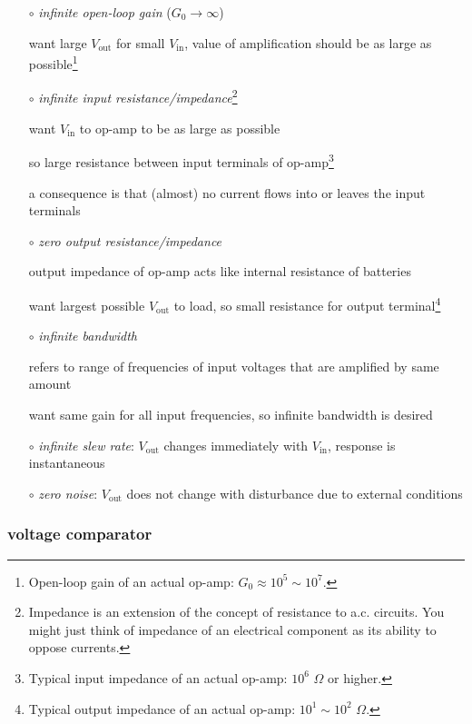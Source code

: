 \begin{itemize}[leftmargin=\parindent]
	\item[$\circ$] \emph{infinite open-loop gain} ($G_0 \to \infty$)
	
	want large $V_\text{out}$ for small $V_\text{in}$, value of amplification should be as large as possible\footnote{Open-loop gain of an actual op-amp: $G_0 \approx 10^5 \sim 10^7$.}
	
	\item[$\circ$] \emph{infinite input resistance/impedance}\footnote{Impedance is an extension of the concept of resistance to a.c. circuits. You might just think of impedance of an electrical component as its ability to oppose currents.}
	
	want $V_\text{in}$ to op-amp to be as large as possible
	
	so large resistance between input terminals of op-amp\footnote{Typical input impedance of an actual op-amp: $10^6$ $\Omega$ or higher.}
	
	a consequence is that (almost) no current flows into or leaves the input terminals
		
	
	\item[$\circ$] \emph{zero output resistance/impedance}
	
	output impedance of op-amp acts like internal resistance of batteries
	
	want largest possible $V_\text{out}$ to load, so small resistance for output terminal\footnote{Typical output impedance of an actual op-amp: $10^1\sim10^2$ $\Omega$.}
	
	\item[$\circ$] \emph{infinite bandwidth}
	
	 refers to range of frequencies of input voltages that are amplified by same amount
	
	want same gain for all input frequencies, so infinite bandwidth is desired
	
	\item[$\circ$] \emph{infinite slew rate}: $V_\text{out}$ changes immediately with $V_\text{in}$, response is instantaneous
	
	\item[$\circ$] \emph{zero noise}: $V_\text{out}$ does not change with disturbance due to external conditions
\end{itemize}

\subsubsection{voltage comparator}

